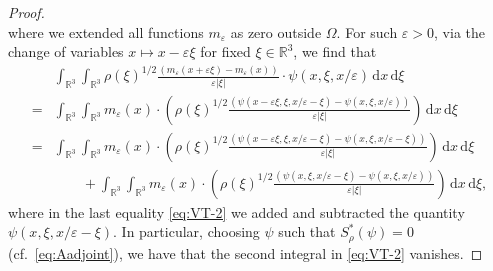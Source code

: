 \documentclass[reqno,11pt]{amsart}
\numberwithin{equation}{section}
\theoremstyle{thmlemcorr}
\numberwithin{theorem}{section}
\theoremstyle{thmlemcorr*}
\theoremstyle{defi}
\theoremstyle{remexample}
\theoremstyle{ass}
\newcommand{\R}{\mathbb{R}}
\renewcommand{\epsilon}{\varepsilon}
\newcommand{\dd}{\,\mathrm{d}}
\newcommand{\1}{\mathds{1}}
\newcommand{\veps}{\varepsilon}
\begin{document}
\begin{proof}
\begin{equation}
    \end{equation}
    where we extended all functions $m_\veps$ as zero outside $\Omega$. For such $\epsilon > 0$, via the change of variables $x \mapsto x - \veps \xi$ for fixed $\xi \in \R^3$, we find that
    \begin{align}
        &\int_{\R^3}\int_{\R^3} \rho(\xi)^{1/2}\frac{(m_\epsilon(x+\epsilon\xi)-m_\epsilon(x))}{\epsilon|\xi|} \cdot \psi(x,\xi,x/\epsilon)\dd x\dd \xi \nonumber \\
        = &\int_{\R^3}\int_{\R^3}m_\epsilon(x) \cdot \left(\rho(\xi)^{1/2}\frac{(\psi(x-\epsilon\xi,\xi,x/\epsilon-\xi)-\psi(x,\xi,x/\epsilon))}{\epsilon|\xi|}\right)\dd x\dd \xi \label{eq:VT-1}\\
        = & \int_{\R^3}\int_{\R^3}m_\epsilon(x) \cdot\left(\rho(\xi)^{1/2}\frac{(\psi(x-\epsilon\xi,\xi,x/\epsilon-\xi)-\psi(x,\xi,x/\epsilon-\xi))}{\epsilon|\xi|}\right)\dd x\dd \xi \label{eq:VT-2} \\
        &\qquad+\int_{\R^3}\int_{\R^3}m_\epsilon(x) \cdot\left(\rho(\xi)^{1/2}\frac{(\psi(x,\xi,x/\epsilon-\xi)-\psi(x,\xi,x/\epsilon))}{\epsilon|\xi|}\right)\dd x\dd \xi, \nonumber
    \end{align}
    where in the last equality \eqref{eq:VT-2} we added and subtracted the quantity $\psi(x,\xi,x/\epsilon-\xi)$. 
    In particular, choosing $\psi$ such that $S_\rho^*(\psi)=0$ (cf.~\eqref{eq:Aadjoint}), we have that the second integral in \eqref{eq:VT-2} vanishes. 
    

\end{proof}
\end{document}
